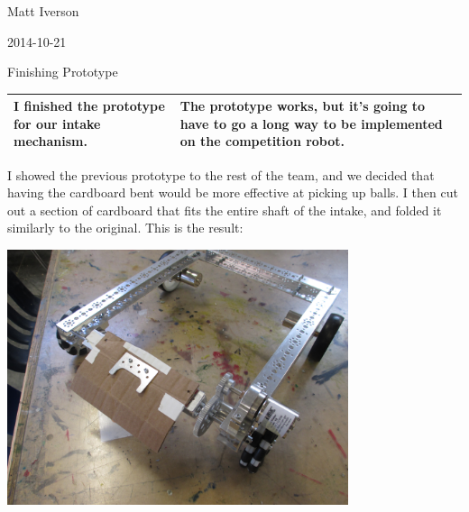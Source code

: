 Matt Iverson

2014-10-21

Finishing Prototype

\begin{tabular}{|p{5cm}|p{5cm}|}
 \hline
 I finished the prototype for our intake mechanism.
 &
 The prototype works, but it’s going to have to go a long way to be implemented on the competition robot.
 \\
 \hline
\end{tabular}

I showed the previous prototype to the rest of the team, and we decided that having the cardboard bent would be more effective at picking up balls. I then cut out a section of cardboard that fits the entire shaft of the intake, and folded it similarly to the original. This is the result: 

\includegraphics[width=10cm]{./Entries/Images/IMG_0016.JPG}

